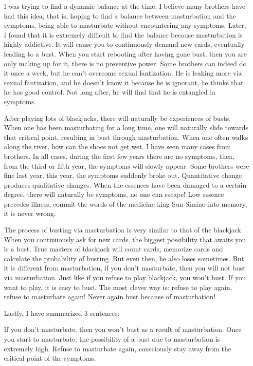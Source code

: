 \documentclass[
]{book}
\begin{document}
I was trying to find a dynamic balance at the time, I believe many brothers have had this idea, that is, hoping to find a balance between masturbation and the symptoms, being able to masturbate without encountering any symptoms. Later, I found that it is extremely difficult to find the balance because masturbation is highly addictive. It will cause you to continuously demand new cards, eventually leading to a bust. When you start rebooting after having gone bust, then you are only making up for it, there is no preventive power. Some brothers can indeed do it once a week, but he can't overcome sexual fantization. He is leaking more via sexual fantization, and he doesn't know it because he is ignorant, he thinks that he has good control. Not long after, he will find that he is entangled in symptoms.

After playing lots of blackjacks, there will naturally be experiences of busts. When one has been masturbating for a long time, one will naturally slide towards that critical point, resulting in bust through masturbation. When one often walks along the river, how can the shoes not get wet. I have seen many cases from brothers. In all cases, during the first few years there are no symptoms, then, from the third or fifth year, the symptoms will slowly appear. Some brothers were fine last year, this year, the symptoms suddenly broke out. Quantitative change produces qualitative changes. When the essences have been damaged to a certain degree, there will naturally be symptoms, no one can escape! Low essence precedes illness, commit the words of the medicine king Sun Simiao into memory, it is never wrong.

The process of busting via masturbation is very similar to that of the blackjack. When you continuously ask for new cards, the biggest possibility that awaits you is a bust. True masters of blackjack will count cards, memorize cards and calculate the probability of busting. But even then, he also loses sometimes. But it is different from masturbation, if you don't masturbate, then you will not bust via masturbation. Just like if you refuse to play blackjack, you won't bust. If you want to play, it is easy to bust. The most clever way is: refuse to play again, refuse to masturbate again! Never again bust because of masturbation!

Lastly, I have summarized 3 sentences:

If you don't masturbate, then you won't bust as a result of masturbation.
Once you start to masturbate, the possibility of a bust due to masturbation is extremely high.
Refuse to masturbate again, consciously stay away from the critical point of the symptoms.
\end{document}
